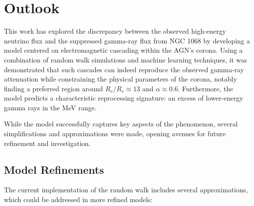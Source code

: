 \chapter{Outlook}
\label{chap:Outlook}

This work has explored the discrepancy between the observed high-energy neutrino flux and the suppressed gamma-ray flux from NGC 1068 by developing a model centered on electromagnetic cascading within the AGN's corona. Using a combination of random walk simulations and machine learning techniques, it was demonstrated that such cascades can indeed reproduce the observed gamma-ray attenuation while constraining the physical parameters of the corona, notably finding a preferred region around $R_c/R_s \approx 13$ and $\alpha \approx 0.6$. Furthermore, the model predicts a characteristic reprocessing signature: an excess of lower-energy gamma rays in the MeV range.

While the model successfully captures key aspects of the phenomenon, several simplifications and approximations were made, opening avenues for future refinement and investigation.

\section{Model Refinements}

The current implementation of the random walk includes several approximations, which could be addressed in more refined models:

